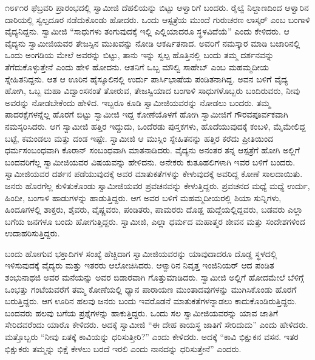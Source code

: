  ೧೮೯೧ರ ಫೆಬ್ರವರಿ ಪ್ರಾರಂಭದಲ್ಲಿ ಸ್ವಾಮೀಜಿ ದೆಹಲಿಯನ್ನು ಬಿಟ್ಟು ಆಳ್ವಾರಿಗೆ ಬಂದರು. ರೈಲ್ವೆ ನಿಲ್ದಾಣದಿಂದ ಆಳ್ವಾರಿನ ದಾರಿಯಲ್ಲಿ ಸ್ವಲ್ಪದೂರ ನಡೆದುಕೊಂಡು ಹೋದರು. ಒಂದು ಆಸ್ಪತ್ರೆಯ ಮುಂದೆ ಗುರುಚರಣ ಲಾಸ್ಕರ್ ಎಂಬ ಬಂಗಾಳಿ ವೈದ್ಯನಿದ್ದನು. ಸ್ವಾಮೀಜಿ “ಸಾಧುಗಳು ತಂಗುವುದಕ್ಕೆ ಇಲ್ಲಿ ಎಲ್ಲಿಯಾದರೂ ಸ್ಥಳವಿದೆಯೆ” ಎಂದು ಕೇಳಿದರು. ಆ ವೈದ್ಯನು ಸ್ವಾಮೀಜಿಯವರ ತೇಜಸ್ಸಿನ ಮುಖವನ್ನು ನೋಡಿ ಆಕರ್ಷಿತನಾದ. ಅವರಿಗೆ ನಮಸ್ಕಾರ ಮಾಡಿ ಬಜಾರಿನಲ್ಲಿ ಒಂದು ಅಂಗಡಿಯ ಮೇಲೆ ಅವರನ್ನು ಬಿಟ್ಟು, ತಾನು ಇನ್ನು ಸ್ವಲ್ಪ ಹೊತ್ತಿನಲ್ಲಿ ಬಂದು ತಮ್ಮ ದರ್ಶನವನ್ನು ತೆಗೆದುಕೊಳ್ಳುತ್ತೇನೆ ಎಂದು ಹೇಳಿ ಹೋದನು. ಆತನಿಗೆ ಒಬ್ಬ ಮೌಲ್ವಿ ಸಾಹೇಬ್ ಎಂಬ ಮಹಮ್ಮದೀಯ ಸ್ನೇಹಿತನಿದ್ದನು. ಆತ ಆ ಊರಿನ ಹೈಸ್ಕೂಲಿನಲ್ಲಿ ಉರ್ದು ಪಾರ್ಸಿಭಾಷೆಯ ಪಂಡಿತನಾಗಿದ್ದ. ಅವನ ಬಳಿಗೆ ವೈದ್ಯ ಹೋಗಿ, ಒಬ್ಬ ಮಹಾ ವಿದ್ವಾಂಸನಂತೆ ತೋರುವ, ತೇಜಸ್ವಿಯಾದ ಬಂಗಾಳಿ ಸಾಧುಗಳೊಬ್ಬರು ಬಂದಿರುವರು, ನೀವು ಅವರನ್ನು ನೋಡಬೇಕೆಂದು ಹೇಳಿದ. ಇಬ್ಬರೂ ಕೂಡಿ ಸ್ವಾಮೀಜಿಯವರನ್ನು ನೋಡಲು ಬಂದರು. ತಮ್ಮ ಪಾದರಕ್ಷೆಗಳನ್ನೆಲ್ಲ ಹೊರಗೆ ಬಿಟ್ಟು ಸ್ವಾಮೀಜಿ ಇದ್ದ ಕೋಣೆಯೊಳಗೆ ಹೋಗಿ ಸ್ವಾಮೀಜಿಗೆ ಗೌರವಪೂರ್ವಕವಾಗಿ ನಮಸ್ಕರಿಸಿದರು. ಆಗ ಸ್ವಾಮೀಜಿ ಹತ್ತಿರ ಇದ್ದುದು, ಒಂದೆರಡು ಪುಸ್ತಕಗಳು, ಹೊದೆಯುವುದಕ್ಕೆ ಕಂಬಳಿ, ಮೈಮೇಲಿದ್ದ ಬಟ್ಟೆ, ಕಮಂಡಲು ಮತ್ತು ದಂಡ ಇಷ್ಟೇ. ಸ್ವಾಮೀಜಿ ಆ ಮುಸ್ಲಿಂ ಸ್ನೇಹಿತನನ್ನು ಹತ್ತಿರ ಕರೆದು ಪ್ರೀತಿಯಿಂದ ಧರ್ಮಸಂಬಂಧವಾಗಿ ಕೊರಾನ್ ಸಂಬಂಧವಾಗಿ ಮಾತನಾಡಿದರು. ವೈದ್ಯನು ಅನಂತರ ತನ್ನ ಆಸ್ಪತ್ರೆಗೆ ಹೋಗಿ ಅಲ್ಲಿಗೆ ಬಂದವರಿಗೆಲ್ಲ ಸ್ವಾಮೀಜಿಯವರ ವಿಷಯವನ್ನು ಹೇಳಿದನು. ಅನೇಕರು ಕುತೂಹಲಿಗಳಾಗಿ ಇವರ ಬಳಿಗೆ ಬಂದರು. ಸ್ವಾಮೀಜಿಯವರ ದರ್ಶನ ಪಡೆಯುವುದಕ್ಕೆ ಅವರ ಮಾತುಕತೆಗಳನ್ನು ಕೇಳುವುದಕ್ಕೆ ಅವರಿದ್ದ ಕೋಣೆ ಸಾಲದಾಯಿತು. ಜನರು ಹೊರಗೆಲ್ಲ ಕುಳಿತುಕೊಂಡು ಸ್ವಾಮೀಜಿಯವರ ಪ್ರವಚನವನ್ನು ಕೇಳುತ್ತಿದ್ದರು. ಪ್ರವಚನದ ಮಧ್ಯೆ ಮಧ್ಯೆ ಉರ್ದು, ಹಿಂದೀ, ಬಂಗಾಳಿ ಹಾಡುಗಳನ್ನು ಹಾಡುತ್ತಿದ್ದರು. ಆಗ ಅವರ ಬಳಿಗೆ ಮಹಮ್ಮದೀಯರಲ್ಲಿ ಶಿಯಾ ಸುನ್ನಿಗಳು, ಹಿಂದೂಗಳಲ್ಲಿ ಶಾಕ್ತರು, ಶೈವರು, ವೈಷ್ಣವರು, ಪಂಡಿತರು, ಪಾಮರರು ದೊಡ್ಡ ಹುದ್ದೆಯಲ್ಲಿದ್ದವರು, ಬಡವರು ಎಲ್ಲಾ ಬಗೆಯ ಜನಗಳೂ ಬಂದು ಹೋಗುತ್ತಿದ್ದರು. ಸ್ವಾಮೀಜಿ, ಎಲ್ಲಾ ಧರ್ಮದ ಮಹಾತ್ಮರ ಜೀವನ ಮತ್ತು ಸಂದೇಶಗಳಿಂದ ಉದಾಹರಿಸುತ್ತಿದ್ದರು. 

 ಬಂದು ಹೋಗುವ ಭಕ್ತಾದಿಗಳ ಸಂಖ್ಯೆ ಹೆಚ್ಚಿದಾಗ ಸ್ವಾಮೀಜಿಯವರನ್ನು ಯಾವುದಾದರೂ ದೊಡ್ಡ ಸ್ಥಳದಲ್ಲಿ ಇಳಿಸುವುದಕ್ಕೆ ವೈದ್ಯರು ಮತ್ತು ಇತರರು ಆಲೋಚಿಸಿದರು. ಆಳ್ವಾರಿನ ನಿವೃತ್ತ ಇಂಜಿನಿಯರ್ ಆದ ಪಂಡಿತ ಶಂಭುನಾಥಜಿ ಅವರ ಮನೆಯನ್ನು ಅವರ ಬಿಡಾರವಾಗಿ ಗೊತ್ತುಮಾಡಿದರು. ಸ್ವಾಮೀಜಿ ಅಲ್ಲಿಗೆ ಹೋದಮೇಲೆ ಬೆಳಿಗ್ಗೆ ಒಂಭತ್ತು ಗಂಟೆಯವರೆಗೆ ತಮ್ಮ ಕೋಣೆಯಲ್ಲಿ ಧ್ಯಾನ ಪಾರಾಯಣ ಮುಂತಾದವುಗಳನ್ನು ಮುಗಿಸಿಕೊಂಡು ಹೊರಗೆ ಬರುತ್ತಿದ್ದರು. ಆಗ ಊರಿನ ಹಲವು ಜನರು ಬಂದು ಇವರೊಡನೆ ಮಾತುಕತೆಗಳನ್ನಾಡಲು ಕಾದುಕೊಂಡಿರುತ್ತಿದ್ದರು. ಬಂದವರು ಹಲವು ಬಗೆಯ ಪ್ರಶ್ನೆಗಳನ್ನು ಹಾಕುತ್ತಿದ್ದರು. ಒಂದು ಸಲ ಸ್ವಾಮೀಜಿಯವರನ್ನು ಯಾವ ಜಾತಿಗೆ ಸೇರಿದವರೆಂದು ಯಾರೊ ಕೇಳಿದರು. ಅದಕ್ಕೆ ಸ್ವಾಮೀಜಿ “ಈ ದೇಹ ಕಾಯಸ್ಥ ಜಾತಿಗೆ ಸೇರಿದುದು” ಎಂದು ಹೇಳಿದರು. ಮತ್ತೊಬ್ಬರು “ನೀವು ಏತಕ್ಕೆ ಕಾವಿಯನ್ನು ಧರಿಸುತ್ತೀರಿ?” ಎಂದು ಕೇಳಿದರು. ಅದಕ್ಕೆ “ಕಾವಿ ಭಿಕ್ಷುಕನ ವಸನ. ಇತರ ಭಿಕ್ಷುಕರು ತಮ್ಮನ್ನು ಭಿಕ್ಷೆ ಕೇಳಲು ಬರದೆ ಇರಲಿ ಎಂದು ನಾನದನ್ನು ಧರಿಸುತ್ತೇನೆ” ಎಂದರು. 

